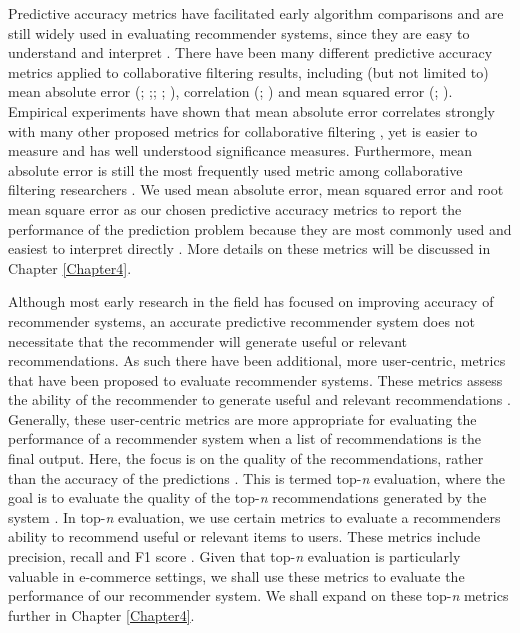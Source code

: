Predictive accuracy metrics have facilitated early algorithm comparisons and are still widely used in evaluating recommender systems, since they are easy to understand and interpret \cite{zangerle2022evaluating}. There have been many different predictive accuracy metrics applied to collaborative filtering results, including (but not limited to) mean absolute error (\cite{breese2013empirical}; \cite{herlocker1999algorithmic};\cite{pennock2013collaborative}; \cite{resnick1994grouplens}; \cite{shardanand1995social}), correlation (\cite{hill1995recommending}; \cite{sarwar2001item}) and mean squared error (\cite{shardanand1995social}; \cite{burke2015robust}). Empirical experiments have shown that mean absolute error correlates strongly with many other proposed metrics for collaborative filtering \cite{herlocker1999algorithmic}, yet is easier to measure and has well understood significance measures. Furthermore, mean absolute error is still the most frequently used metric among collaborative filtering researchers \cite{zangerle2022evaluating}. We used mean absolute error, mean squared error and root mean square error as our chosen predictive accuracy metrics to report the performance of the prediction problem because they are most commonly used and easiest to interpret directly \cite{zangerle2022evaluating}. More details on these metrics will be discussed in Chapter \ref{Chapter4}.

Although most early research in the field has focused on improving accuracy of recommender systems, an accurate predictive recommender system does not necessitate that the recommender will generate useful or relevant recommendations. As such there have been additional, more user-centric, metrics that have been proposed to evaluate recommender systems. These metrics assess the ability of the recommender to generate useful and relevant recommendations \cite{madadipouya2017literature}. Generally, these user-centric metrics are more appropriate for evaluating the performance of a recommender system when a list of recommendations is the final output. Here, the focus is on the quality of the recommendations, rather than the accuracy of the predictions \cite{zangerle2022evaluating}. This is termed top-\textit{n} evaluation, where the goal is to evaluate the quality of the top-\textit{n} recommendations generated by the system \cite{cremonesi2010performance}. In top-\textit{n} evaluation, we use certain metrics to evaluate a recommenders ability to recommend useful or relevant items to users. These metrics include precision, recall and F1 score \cite{cremonesi2010performance}. Given that top-\textit{n} evaluation is particularly valuable in e-commerce settings, we shall use these metrics to evaluate the performance of our recommender system. We shall expand on these top-\textit{n} metrics further in Chapter \ref{Chapter4}.

